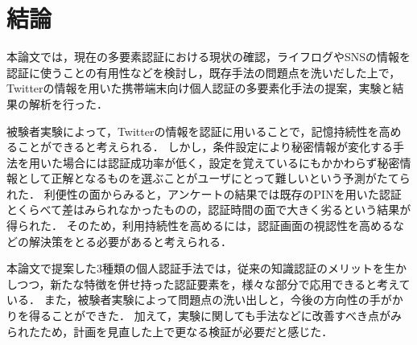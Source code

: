 \chapter{結論}\label{chap:conclusion}
本論文では，現在の多要素認証における現状の確認，ライフログやSNSの情報を認証に使うことの有用性などを検討し，既存手法の問題点を洗いだした上で，Twitterの情報を用いた携帯端末向け個人認証の多要素化手法の提案，実験と結果の解析を行った．

被験者実験によって，Twitterの情報を認証に用いることで，記憶持続性を高めることができると考えられる．
しかし，条件設定により秘密情報が変化する手法を用いた場合には認証成功率が低く，設定を覚えているにもかかわらず秘密情報として正解となるものを選ぶことがユーザにとって難しいという予測がたてられた．
利便性の面からみると，アンケートの結果では既存のPINを用いた認証とくらべて差はみられなかったものの，認証時間の面で大きく劣るという結果が得られた．
そのため，利用持続性を高めるには，認証画面の視認性を高めるなどの解決策をとる必要があると考えられる．

本論文で提案した3種類の個人認証手法では，従来の知識認証のメリットを生かしつつ，新たな特徴を併せ持った認証要素を，様々な部分で応用できると考えている．
また，被験者実験によって問題点の洗い出しと，今後の方向性の手がかりを得ることができた．
加えて，実験に関しても手法などに改善すべき点がみられたため，計画を見直した上で更なる検証が必要だと感じた．


\newpage
